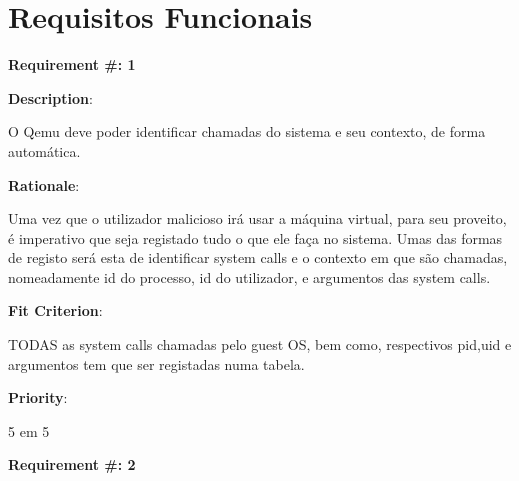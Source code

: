 \pagebreak
\section{Requisitos Funcionais}



\begin{minipage}{0.55\textwidth}
\begin{flushleft}\textbf{Requirement \#: 1}\end{flushleft}
\end{minipage}
\begin{minipage}{0.4\textwidth}
\end{minipage}

\begin{description}
\item \textbf{Description}:

O Qemu deve poder identificar chamadas do sistema e seu contexto, de forma automática. \\

\item \textbf{Rationale}:

Uma vez que o utilizador malicioso irá usar a máquina virtual, para seu proveito, é imperativo que seja registado
tudo o que ele faça no sistema. Umas das formas de registo será esta de identificar system calls e o contexto em que são chamadas,
nomeadamente id do processo, id do utilizador, e argumentos das system calls.

\item \textbf{Fit Criterion}:

TODAS as system calls chamadas pelo guest OS, bem como, respectivos pid,uid e argumentos tem que ser registadas numa tabela. 

\item \textbf{Priority}:

5 em 5

\end{description}

\pagebreak













\begin{minipage}{0.55\textwidth}
\begin{flushleft}\textbf{Requirement \#: 2}\end{flushleft}
\end{minipage}
\begin{minipage}{0.4\textwidth}
\end{minipage}


